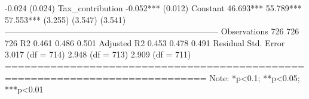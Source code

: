                                                     -0.024                                                                       (0.024)                                                                                    Tax_contribution                                                -0.052***                                                                      (0.012)                                                                                    Constant                      46.693***        55.789***        57.553***                                    (3.255)          (3.547)          (3.541)                                                                                    ----------------------------------------------------------------------------- Observations                     726              726              726        R2                              0.461            0.486            0.501       Adjusted R2                     0.453            0.478            0.491       Residual Std. Error        3.017 (df = 714) 2.948 (df = 713) 2.909 (df = 711) ============================================================================= Note:                                             *p<0.1; **p<0.05; ***p<0.01